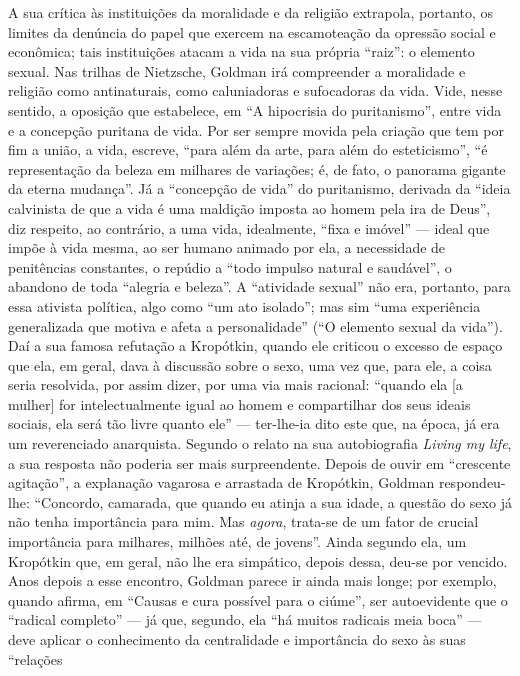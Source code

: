 A sua crítica às instituições da moralidade e da religião extrapola,
portanto, os limites da denúncia do papel que exercem na escamoteação da
opressão social e econômica; tais instituições atacam a vida na sua
própria ``raiz'': o elemento sexual. Nas trilhas de Nietzsche, Goldman
irá compreender a moralidade e religião como antinaturais, como
caluniadoras e sufocadoras da vida. Vide, nesse sentido, a oposição que
estabelece, em ``A hipocrisia do puritanismo'', entre vida e a concepção
puritana de vida. Por ser sempre movida pela criação que tem por fim a
união, a vida, escreve, ``para além da arte, para além do esteticismo'',
``é representação da beleza em milhares de variações; é, de fato, o
panorama gigante da eterna mudança''. Já a ``concepção de vida'' do
puritanismo, derivada da ``ideia calvinista de que a vida é uma maldição
imposta ao homem pela ira de Deus'', diz respeito, ao contrário, a uma
vida, idealmente, ``fixa e imóvel'' --- ideal que impõe à vida mesma, ao
ser humano animado por ela, a necessidade de penitências constantes, o
repúdio a ``todo impulso natural e saudável'', o abandono de toda
``alegria e beleza''. A ``atividade sexual'' não era, portanto, para
essa ativista política, algo como ``um ato isolado''; mas sim ``uma
experiência generalizada que motiva e afeta a personalidade'' (``O
elemento sexual da vida''). Daí a sua famosa refutação a Kropótkin,
quando ele criticou o excesso de espaço que ela, em geral, dava à
discussão sobre o sexo, uma vez que, para ele, a coisa seria resolvida,
por assim dizer, por uma via mais racional: ``quando ela {[}a mulher{]}
for intelectualmente igual ao homem e compartilhar dos seus ideais
sociais, ela será tão livre quanto ele'' --- ter-lhe-ia dito este que, na
época, já era um reverenciado anarquista. Segundo o relato na sua
autobiografia \emph{Living my life}, a sua resposta não poderia ser mais
surpreendente. Depois de ouvir em ``crescente agitação'', a explanação
vagarosa e arrastada de Kropótkin, Goldman respondeu-lhe: ``Concordo,
camarada, que quando eu atinja a sua idade, a questão do sexo já não
tenha importância para mim. Mas \emph{agora}, trata-se de um fator de
crucial importância para milhares, milhões até, de jovens''. Ainda
segundo ela, um Kropótkin que, em geral, não lhe era simpático, depois
dessa, deu-se por vencido. Anos depois a esse encontro, Goldman parece
ir ainda mais longe; por exemplo, quando afirma, em ``Causas e cura
possível para o ciúme'', ser autoevidente que o ``radical completo'' ---
já que, segundo, ela ``há muitos radicais meia boca'' --- deve aplicar o
conhecimento da centralidade e importância do sexo às suas ``relações
